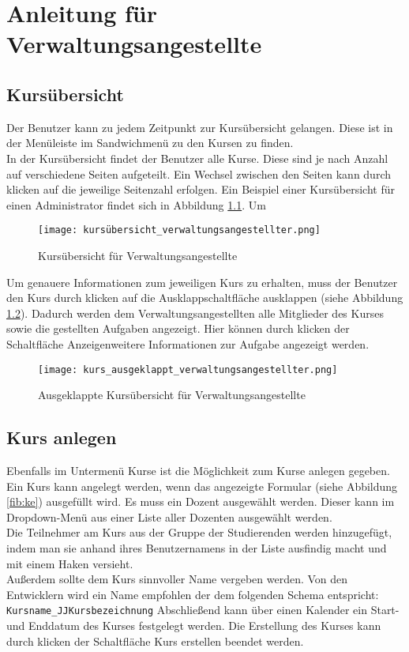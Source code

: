 
\chapter{Anleitung für Verwaltungsangestellte}
\label{sec:chap1}
\section{Kursübersicht}
Der Benutzer kann zu jedem Zeitpunkt zur Kursübersicht gelangen. Diese ist in der Menüleiste im Sandwichmenü zu den Kursen zu finden.\\
In der Kursübersicht findet der Benutzer alle Kurse. Diese sind je nach Anzahl auf verschiedene Seiten aufgeteilt. Ein Wechsel zwischen den Seiten kann durch klicken auf die jeweilige Seitenzahl erfolgen. Ein Beispiel einer Kursübersicht für einen Administrator findet sich in Abbildung \ref{fib:kü}. Um

\begin{figure}[h]
\centering
\texttt{[image: kursübersicht\_verwaltungsangestellter.png]}
\caption{Kursübersicht für Verwaltungsangestellte}
\label{fib:kü}
\end{figure}

Um genauere Informationen zum jeweiligen Kurs zu erhalten, muss der Benutzer den Kurs durch klicken auf die Ausklappschaltfläche ausklappen (siehe Abbildung \ref{fib:kü-ausgeklappt}). Dadurch werden dem Verwaltungsangestellten alle Mitglieder des Kurses sowie die gestellten Aufgaben angezeigt. Hier können durch klicken der Schaltfläche \glqq Anzeigen\grqq weitere Informationen zur Aufgabe angezeigt werden. 

\begin{figure}[h]
\centering
\texttt{[image: kurs\_ausgeklappt\_verwaltungsangestellter.png]}
\caption{Ausgeklappte Kursübersicht für Verwaltungsangestellte}
\label{fib:kü-ausgeklappt}
\end{figure}

\section{Kurs anlegen}
Ebenfalls im Untermenü Kurse ist die Möglichkeit zum Kurse anlegen gegeben.\\
Ein Kurs kann angelegt werden, wenn das angezeigte Formular (siehe Abbildung \ref{fib:ke}) ausgefüllt wird. Es muss ein Dozent ausgewählt werden. Dieser kann im Dropdown-Menü aus einer Liste aller Dozenten ausgewählt werden. \\
Die Teilnehmer am Kurs aus der Gruppe der Studierenden werden hinzugefügt, indem man sie anhand ihres Benutzernamens in der Liste ausfindig macht und mit einem Haken versieht. \\
Außerdem sollte dem Kurs sinnvoller Name vergeben werden. Von den Entwicklern wird ein Name empfohlen der dem folgenden Schema entspricht: \\
\verb/Kursname_JJKursbezeichnung/
Abschließend kann über einen Kalender ein Start- und Enddatum des Kurses festgelegt werden. 
Die Erstellung des Kurses kann durch klicken der Schaltfläche \glqq Kurs erstellen\grqq\: beendet werden.

